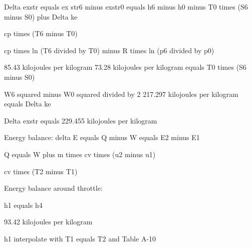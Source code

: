 Delta exstr equals ex str6 minus exstr0  
equals h6 minus h0 minus T0 times (S6 minus S0) plus Delta ke

cp times (T6 minus T0)

cp times ln (T6 divided by T0) minus R times ln (p6 divided by p0)

85.43 kilojoules per kilogram  
73.28 kilojoules per kilogram equals T0 times (S6 minus S0)

W6 squared minus W0 squared divided by 2  
217.297 kilojoules per kilogram equals Delta ke

Delta exstr equals 229.455 kilojoules per kilogram

Energy balance: delta E equals Q minus W equals E2 minus E1  

Q equals W plus m times cv times (u2 minus u1)  

cv times (T2 minus T1)

Energy balance around throttle: 

h1 equals h4 

93.42 kilojoules per kilogram

h1 interpolate with T1 equals T2 and Table A-10